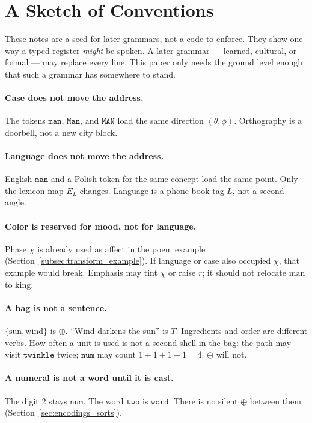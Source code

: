 \documentclass[12pt, a4paper]{article}
\begin{document}
\section{A Sketch of Conventions}
\label{sec:conventions_sketch}
These notes are a seed for later grammars, not a code to enforce.
They show one way a typed register \emph{might} be spoken. A later
grammar --- learned, cultural, or formal --- may replace every line.
This paper only needs the ground level enough that such a grammar has
somewhere to stand.

\paragraph{Case does not move the address.}
The tokens $\texttt{man}$, $\texttt{Man}$, and $\texttt{MAN}$ load the
same direction $(\theta,\phi)$. Orthography is a doorbell, not a new
city block.

\paragraph{Language does not move the address.}
English $\texttt{man}$ and a Polish token for the same concept load the
same point. Only the lexicon map $E_L$ changes. Language is a
phone-book tag $L$, not a second angle.

\paragraph{Color is reserved for mood, not for language.}
Phase $\chi$ is already used as affect in the poem example
(Section~\ref{subsec:transform_example}). If language or case also
occupied $\chi$, that example would break. Emphasis may tint $\chi$
or raise $r$; it should not relocate $\mathrm{man}$ to $\mathrm{king}$.

\paragraph{A bag is not a sentence.}
$\{\mathrm{sun},\mathrm{wind}\}$ is $\oplus$.
``Wind darkens the sun'' is $T$. Ingredients and order are different
verbs. How often a unit is used is not a second shell in the bag:
the path may visit $\texttt{twinkle}$ twice; $\mathtt{num}$ may
count $1+1+1+1=4$. $\oplus$ will not.

\paragraph{A numeral is not a word until it is cast.}
The digit $2$ stays $\mathtt{num}$. The word $\texttt{two}$ is
$\mathtt{word}$. There is no silent $\oplus$ between them
(Section~\ref{sec:encodings_sorts}).
\end{document}
